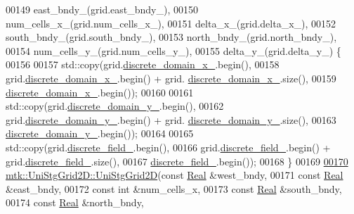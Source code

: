 \begin{DoxyCode}
00149     east\_bndy\_(grid.east\_bndy\_),
00150     num\_cells\_x\_(grid.num\_cells\_x\_),
00151     delta\_x\_(grid.delta\_x\_),
00152     south\_bndy\_(grid.south\_bndy\_),
00153     north\_bndy\_(grid.north\_bndy\_),
00154     num\_cells\_y\_(grid.num\_cells\_y\_),
00155     delta\_y\_(grid.delta\_y\_) \{
00156 
00157     std::copy(grid.\hyperlink{classmtk_1_1UniStgGrid2D_ab15979865852583a46662ea592f27a4f}{discrete\_domain\_x\_}.begin(),
00158               grid.\hyperlink{classmtk_1_1UniStgGrid2D_ab15979865852583a46662ea592f27a4f}{discrete\_domain\_x\_}.begin() + grid.
      \hyperlink{classmtk_1_1UniStgGrid2D_ab15979865852583a46662ea592f27a4f}{discrete\_domain\_x\_}.size(),
00159               \hyperlink{classmtk_1_1UniStgGrid2D_ab15979865852583a46662ea592f27a4f}{discrete\_domain\_x\_}.begin());
00160 
00161     std::copy(grid.\hyperlink{classmtk_1_1UniStgGrid2D_ad69f93d4b27707d97f209b907383a7a2}{discrete\_domain\_y\_}.begin(),
00162               grid.\hyperlink{classmtk_1_1UniStgGrid2D_ad69f93d4b27707d97f209b907383a7a2}{discrete\_domain\_y\_}.begin() + grid.
      \hyperlink{classmtk_1_1UniStgGrid2D_ad69f93d4b27707d97f209b907383a7a2}{discrete\_domain\_y\_}.size(),
00163               \hyperlink{classmtk_1_1UniStgGrid2D_ad69f93d4b27707d97f209b907383a7a2}{discrete\_domain\_y\_}.begin());
00164 
00165     std::copy(grid.\hyperlink{classmtk_1_1UniStgGrid2D_ad7474b2669ee988b84aed20b7f5dc7be}{discrete\_field\_}.begin(),
00166               grid.\hyperlink{classmtk_1_1UniStgGrid2D_ad7474b2669ee988b84aed20b7f5dc7be}{discrete\_field\_}.begin() + grid.\hyperlink{classmtk_1_1UniStgGrid2D_ad7474b2669ee988b84aed20b7f5dc7be}{discrete\_field\_}.size(),
00167               \hyperlink{classmtk_1_1UniStgGrid2D_ad7474b2669ee988b84aed20b7f5dc7be}{discrete\_field\_}.begin());
00168 \}
00169 
\hypertarget{mtk__uni__stg__grid__2d_8cc_source_l00170}{}\hyperlink{classmtk_1_1UniStgGrid2D_a9d96b31002c1deb3a90954bbb112487e}{00170} \hyperlink{classmtk_1_1UniStgGrid2D_a40db9a6d21e0f4cf70c478fcc3b94531}{mtk::UniStgGrid2D::UniStgGrid2D}(\textcolor{keyword}{const} \hyperlink{group__c01-roots_gac080bbbf5cbb5502c9f00405f894857d}{Real} &west\_bndy,
00171                                 \textcolor{keyword}{const} \hyperlink{group__c01-roots_gac080bbbf5cbb5502c9f00405f894857d}{Real} &east\_bndy,
00172                                 \textcolor{keyword}{const} \textcolor{keywordtype}{int} &num\_cells\_x,
00173                                 \textcolor{keyword}{const} \hyperlink{group__c01-roots_gac080bbbf5cbb5502c9f00405f894857d}{Real} &south\_bndy,
00174                                 \textcolor{keyword}{const} \hyperlink{group__c01-roots_gac080bbbf5cbb5502c9f00405f894857d}{Real} &north\_bndy,

\end{DoxyCode}
